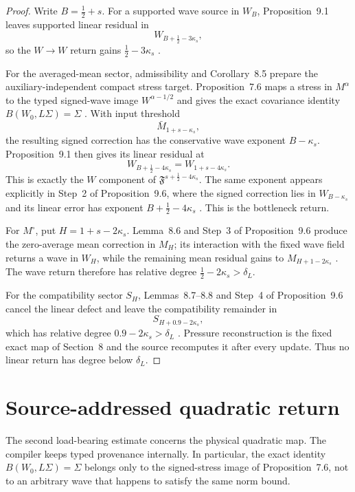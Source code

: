 \documentclass[11pt]{article}
\numberwithin{equation}{section}
\theoremstyle{highend}
\theoremstyle{definition}
\newcommand{\F}{\mathfrak F}
\begin{document}
\begin{proof}
Write $B=\frac12+s$. For a supported wave source in $W_B$, Proposition~9.1 leaves supported linear residual in
\[
W_{B+\frac12-3\kappa_s},
\]
so the $W\to W$ return gains $\frac12-3\kappa_s$ \cite[pp.~101--102]{OpenAI2026NS}.

For the averaged-mean sector, admissibility and Corollary~8.5 prepare the auxiliary-independent compact stress target. Proposition~7.6 maps a stress in $M^\alpha$ to the typed signed-wave image $W^{\alpha-1/2}$ and gives the exact covariance identity $B(W_0,L\Sigma)=\Sigma$ \cite[pp.~84--85]{OpenAI2026NS}. With input threshold
\[
\bar M_{1+s-\kappa_s},
\]
the resulting signed correction has the conservative wave exponent $B-\kappa_s$. Proposition~9.1 then gives its linear residual at
\[
W_{B+\frac12-4\kappa_s}
=
W_{1+s-4\kappa_s}.
\]
This is exactly the $W$ component of $\F^{s+\frac12-4\kappa_s}$. The same exponent appears explicitly in Step~2 of Proposition~9.6, where the signed correction lies in $W_{B-\kappa_s}$ and its linear error has exponent $B+\frac12-4\kappa_s$ \cite[pp.~109--110]{OpenAI2026NS}. This is the bottleneck return.

For $M^\circ$, put $H=1+s-2\kappa_s$. Lemma~8.6 and Step~3 of Proposition~9.6 produce the zero-average mean correction in $M_H$; its interaction with the fixed wave field returns a wave in $W_H$, while the remaining mean residual gains to $M_{H+1-2\kappa_s}$ \cite[pp.~96,110]{OpenAI2026NS}. The wave return therefore has relative degree $\frac12-2\kappa_s>\delta_L$.

For the compatibility sector $S_H$, Lemmas~8.7--8.8 and Step~4 of Proposition~9.6 cancel the linear defect and leave the compatibility remainder in
\[
S_{H+0.9-2\kappa_s},
\]
which has relative degree $0.9-2\kappa_s>\delta_L$ \cite[pp.~97--99,111]{OpenAI2026NS}. Pressure reconstruction is the fixed exact map of Section~8 and the source recomputes it after every update. Thus no linear return has degree below $\delta_L$.
\end{proof}

\section{Source-addressed quadratic return}
The second load-bearing estimate concerns the physical quadratic map. The compiler keeps typed provenance internally. In particular, the exact identity $B(W_0,L\Sigma)=\Sigma$ belongs only to the signed-stress image of Proposition~7.6, not to an arbitrary wave that happens to satisfy the same norm bound.
\end{document}
